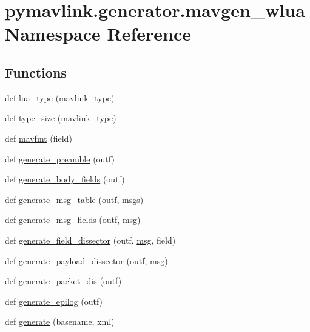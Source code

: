 \hypertarget{namespacepymavlink_1_1generator_1_1mavgen__wlua}{}\section{pymavlink.\+generator.\+mavgen\+\_\+wlua Namespace Reference}
\label{namespacepymavlink_1_1generator_1_1mavgen__wlua}
\subsection*{Functions}
\begin{DoxyCompactItemize}
\item 
def \mbox{\hyperlink{namespacepymavlink_1_1generator_1_1mavgen__wlua_a2f87dcc75f8b9a6b8b417bf387b1a224}{lua\+\_\+type}} (mavlink\+\_\+type)
\item 
def \mbox{\hyperlink{namespacepymavlink_1_1generator_1_1mavgen__wlua_aaced6c6a179f60dbd142ca923718ab12}{type\+\_\+size}} (mavlink\+\_\+type)
\item 
def \mbox{\hyperlink{namespacepymavlink_1_1generator_1_1mavgen__wlua_a1007bc04078ec16dd974ffb4cbb23475}{mavfmt}} (field)
\item 
def \mbox{\hyperlink{namespacepymavlink_1_1generator_1_1mavgen__wlua_ae446521d9f00c70028d9cb99443108b2}{generate\+\_\+preamble}} (outf)
\item 
def \mbox{\hyperlink{namespacepymavlink_1_1generator_1_1mavgen__wlua_a370d0ccb6cf4e13152f5e241b6d8b7d8}{generate\+\_\+body\+\_\+fields}} (outf)
\item 
def \mbox{\hyperlink{namespacepymavlink_1_1generator_1_1mavgen__wlua_aab77022f5146a6676fe580ef01a92f92}{generate\+\_\+msg\+\_\+table}} (outf, msgs)
\item 
def \mbox{\hyperlink{namespacepymavlink_1_1generator_1_1mavgen__wlua_a5a9d333c1ab8267705564a52bc232871}{generate\+\_\+msg\+\_\+fields}} (outf, \mbox{\hyperlink{stratnode_8cpp_a82cfe4ed9bc9e1b07c8bf209c324d85b}{msg}})
\item 
def \mbox{\hyperlink{namespacepymavlink_1_1generator_1_1mavgen__wlua_afe2afd7ec0108cdf0fa8c59ae3d305b0}{generate\+\_\+field\+\_\+dissector}} (outf, \mbox{\hyperlink{stratnode_8cpp_a82cfe4ed9bc9e1b07c8bf209c324d85b}{msg}}, field)
\item 
def \mbox{\hyperlink{namespacepymavlink_1_1generator_1_1mavgen__wlua_a8e47b34f4ff18421908d9ccb5e532fa9}{generate\+\_\+payload\+\_\+dissector}} (outf, \mbox{\hyperlink{stratnode_8cpp_a82cfe4ed9bc9e1b07c8bf209c324d85b}{msg}})
\item 
def \mbox{\hyperlink{namespacepymavlink_1_1generator_1_1mavgen__wlua_ab1b596877b4a70281a8fc422674df76a}{generate\+\_\+packet\+\_\+dis}} (outf)
\item 
def \mbox{\hyperlink{namespacepymavlink_1_1generator_1_1mavgen__wlua_aa34b360e4cc48e283746824c3b7cb416}{generate\+\_\+epilog}} (outf)
\item 
def \mbox{\hyperlink{namespacepymavlink_1_1generator_1_1mavgen__wlua_a3d1e27fd417fd358d786d3383cb3cefd}{generate}} (basename, xml)
\end{DoxyCompactItemize}
